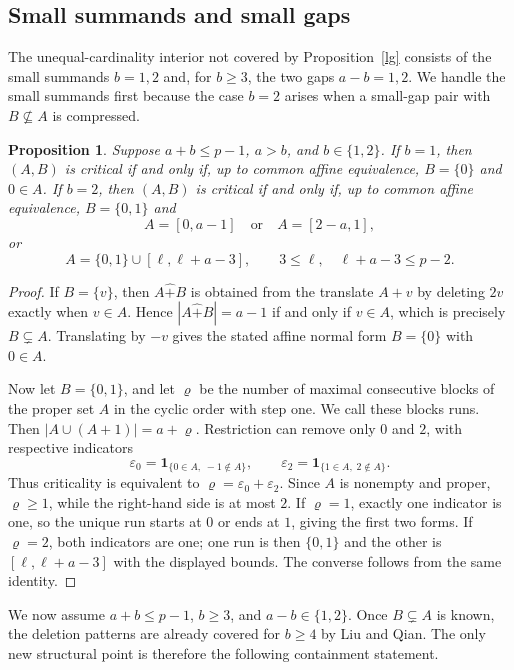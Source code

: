 \documentclass[10pt,a4paper]{amsart}
\newtheorem{proposition}{Proposition}[section]
\newcommand{\rs}{\mathbin{\widehat+}}
\newcommand{\ind}{\mathbf 1}
\begin{document}
\subsection{Small summands and small gaps}\label{smallgapinterior}

The unequal-cardinality interior not covered by Proposition~\ref{lg}
consists of the small summands $b=1,2$ and, for $b\ge3$, the two gaps
$a-b=1,2$.  We handle the small summands first because the case $b=2$
arises when a small-gap pair with $B\nsubseteq A$ is compressed.

\begin{proposition}\label{smallcard}
Suppose $a+b\le p-1$, $a>b$, and $b\in\{1,2\}$.  If $b=1$, then
$(A,B)$ is critical if and only if, up to common affine equivalence,
$B=\{0\}$ and $0\in A$.  If $b=2$, then $(A,B)$ is critical if and
only if, up to common affine equivalence, $B=\{0,1\}$ and
\[
 A=[0,a-1]\quad\text{or}\quad A=[2-a,1],
\]
or
\[
 A=\{0,1\}\cup[\ell,\ell+a-3],
 \qquad 3\le\ell,\quad \ell+a-3\le p-2.
\]
\end{proposition}
\begin{proof}
If $B=\{v\}$, then $A\rs B$ is obtained from the translate $A+v$ by
deleting $2v$ exactly when $v\in A$.  Hence
$|A\rs B|=a-1$ if and only if $v\in A$, which is precisely $B\subsetneq A$.  Translating by $-v$ gives the
stated affine normal form $B=\{0\}$ with $0\in A$.

Now let $B=\{0,1\}$, and let $\varrho$ be the number of maximal
consecutive blocks of the proper set $A$ in the cyclic order with
step one.  We call these blocks runs.  Then
$|A\cup(A+1)|=a+\varrho$.  Restriction can remove only $0$ and $2$,
with respective indicators
\[
 \varepsilon_0=\ind_{\{0\in A,\;-1\notin A\}},\qquad
 \varepsilon_2=\ind_{\{1\in A,\;2\notin A\}}.
\]
Thus criticality is equivalent to $\varrho=\varepsilon_0+\varepsilon_2$.
Since $A$ is nonempty and proper, $\varrho\ge1$, while the right-hand
side is at most $2$.  If $\varrho=1$, exactly one indicator is one, so
the unique run starts at $0$ or ends at $1$, giving the first two forms.
If $\varrho=2$, both indicators are one; one run is then $\{0,1\}$ and
the other is $[\ell,\ell+a-3]$ with the displayed bounds.  The converse
follows from the same identity.
\end{proof}

We now assume $a+b\le p-1$, $b\ge3$, and $a-b\in\{1,2\}$.
Once $B\subsetneq A$ is known, the deletion patterns are already covered
for $b\ge4$ by Liu and Qian.  The only new structural point is therefore
the following containment statement.
\end{document}
